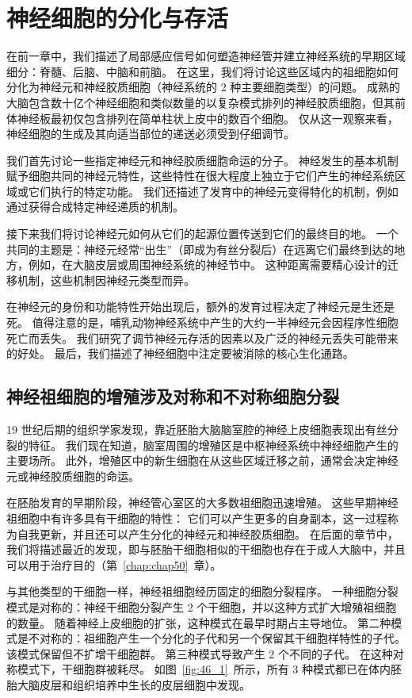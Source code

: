\chapter{神经细胞的分化与存活} \label{chap:chap46}


在前一章中，我们描述了局部感应信号如何塑造神经管并建立神经系统的早期区域细分：脊髓、后脑、中脑和前脑。
在这里，我们将讨论这些区域内的祖细胞如何分化为神经元和神经胶质细胞（神经系统的 2 种主要细胞类型）的问题。
成熟的大脑包含数十亿个神经细胞和类似数量的以复杂模式排列的神经胶质细胞，但其前体神经板最初仅包含排列在简单柱状上皮中的数百个细胞。
仅从这一观察来看，神经细胞的生成及其向适当部位的递送必须受到仔细调节。


我们首先讨论一些指定神经元和神经胶质细胞命运的分子。
神经发生的基本机制赋予细胞共同的神经元特性，这些特性在很大程度上独立于它们产生的神经系统区域或它们执行的特定功能。
我们还描述了发育中的神经元变得特化的机制，例如通过获得合成特定神经递质的机制。


接下来我们将讨论神经元如何从它们的起源位置传送到它们的最终目的地。
一个共同的主题是：神经元经常“出生”（即成为有丝分裂后）在远离它们最终到达的地方，例如，在大脑皮层或周围神经系统的神经节中。
这种距离需要精心设计的迁移机制，这些机制因神经元类型而异。




在神经元的身份和功能特性开始出现后，额外的发育过程决定了神经元是生还是死。
值得注意的是，哺乳动物神经系统中产生的大约一半神经元会因程序性细胞死亡而丢失。
我们研究了调节神经元存活的因素以及广泛的神经元丢失可能带来的好处。
最后，我们描述了神经细胞中注定要被消除的核心生化通路。



\section{神经祖细胞的增殖涉及对称和不对称细胞分裂}

19 世纪后期的组织学家发现，靠近胚胎大脑脑室腔的神经上皮细胞表现出有丝分裂的特征。
我们现在知道，脑室周围的增殖区是中枢神经系统中神经细胞产生的主要场所。
此外，增殖区中的新生细胞在从这些区域迁移之前，通常会决定神经元或神经胶质细胞的命运。


在胚胎发育的早期阶段，神经管心室区的大多数祖细胞迅速增殖。
这些早期神经祖细胞中有许多具有干细胞的特性：
它们可以产生更多的自身副本，这一过程称为自我更新，并且还可以产生分化的神经元和神经胶质细胞。
在后面的章节中，我们将描述最近的发现，即与胚胎干细胞相似的干细胞也存在于成人大脑中，并且可以用于治疗目的（第~\ref{chap:chap50}~章）。


与其他类型的干细胞一样，神经祖细胞经历固定的细胞分裂程序。
一种细胞分裂模式是对称的：神经干细胞分裂产生 2 个干细胞，并以这种方式扩大增殖祖细胞的数量。
随着神经上皮细胞的扩张，这种模式在最早时期占主导地位。
第二种模式是不对称的：祖细胞产生一个分化的子代和另一个保留其干细胞样特性的子代。
该模式保留但不扩增干细胞群。
第三种模式导致产生 2 个不同的子代。
在这种对称模式下，干细胞群被耗尽。
如图~\ref{fig:46_1}~所示，所有 3 种模式都已在体内胚胎大脑皮层和组织培养中生长的皮层细胞中发现。


